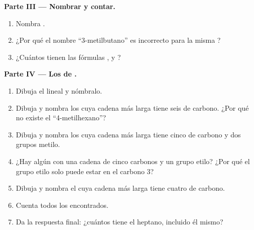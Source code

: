 \begin{problem}
\medskip
\noindent\textbf{Parte III --- Nombrar y contar.}
\begin{enumerate}[resume]
  \item Nombra .
  \item ¿Por qué el nombre ``3-metilbutano'' es incorrecto para la misma
        ?
  \item ¿Cuántos   tienen las fórmulas ,
         y ?
\end{enumerate}

\medskip
\noindent\textbf{Parte IV --- Los  de .}
\begin{enumerate}[resume]
  \item Dibuja el  lineal y nómbralo.
  \item Dibuja y nombra los  cuya cadena más larga tiene seis
         de carbono. ¿Por qué no existe el ``4-metilhexano''?
  \item Dibuja y nombra los  cuya cadena más larga tiene cinco
         de carbono y dos grupos metilo.
  \item ¿Hay algún  con una cadena de cinco carbonos y un grupo
        etilo? ¿Por qué el grupo etilo solo puede estar en el carbono 3?
  \item Dibuja y nombra el  cuya cadena más larga tiene cuatro
         de carbono.
  \item Cuenta todos los  encontrados.
  \item Da la respuesta final: ¿cuántos  tiene
        el heptano, incluido él mismo?
\end{enumerate}
\end{problem}
